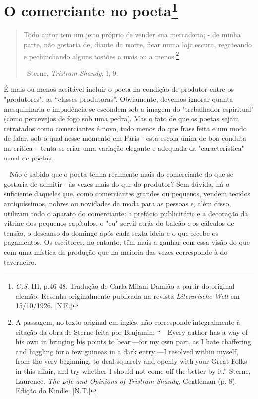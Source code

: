\chapter{O comerciante no poeta\footnote[*]{\emph{G.S}. III, p.46-48. Tradução de Carla Milani Damião a partir do
  original alemão. Resenha originalmente publicada na revista
  \emph{Literarische Welt} em 15/10/1926. [N.E.]}}

\begin{quote}
Todo autor tem um jeito próprio de vender sua mercadoria; - de minha
parte, não gostaria de, diante da morte, ficar numa loja escura,
regateando e pechinchando alguns tostões a mais ou a menos.\footnote{A
  passagem, no texto original em inglês, não corresponde integralmente à
  citação da obra de Sterne feita por Benjamin: ``---Every author has a
  way of his own in bringing his points to bear;---for my own part, as I
  hate chaffering and higgling for a few guineas in a dark entry;---I
  resolved within myself, from the very beginning, to deal squarely and
  openly with your Great Folks in this affair, and try whether I should
  not come off the better by it.'' Sterne, Laurence. \emph{The Life and
  Opinions of Tristram Shandy}, Gentleman (p. 8). Edição do Kindle.
  {[}N.T.{]}}

~Sterne, \emph{Tristram Shandy}, I, 9.
\end{quote}

É mais ou menos aceitável incluir o poeta na condição de produtor entre
os "produtores", as ``classes produtoras''. Obviamente, devemos ignorar
quanta mesquinharia e impudência se escondem sob a imagem do
"trabalhador espiritual" (como percevejos de fogo sob uma pedra). Mas o
fato de que os poetas sejam retratados como comerciantes é novo, tudo
menos do que frase feita e um modo de falar, sob o qual nesse momento em
Paris - esta escola única de boa conduta na crítica -- tenta-se criar
uma variação elegante e adequada da "característica" usual de poetas.

~ Não é sabido que o poeta tenha realmente mais do comerciante do que se
gostaria de admitir - às vezes mais do que do produtor? Sem dúvida, há o
suficiente daqueles que, como comerciantes grandes ou pequenos, vendem
tecidos antiquíssimos, nobres ou novidades da moda para as pessoas e,
além disso, utilizam todo o aparato do comerciante: o prefácio
publicitário e a decoração da vitrine dos pequenos capítulos, o "eu"
servil atrás do balcão e os cálculos de tensão, o descanso do domingo
após cada sexta ideia e o que recebe os pagamentos. Os escritores, no
entanto, têm mais a ganhar com essa visão do que com uma mística da
produção que na maioria das vezes corresponde à do taverneiro.

